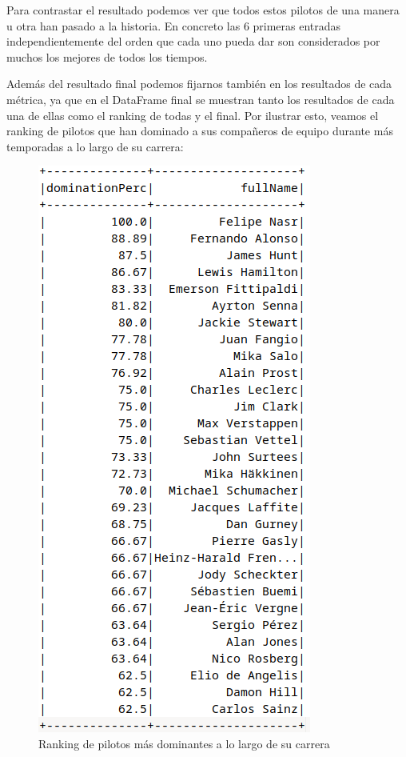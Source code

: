 \documentclass[12pt,twoside,titlepage]{report}
\begin{document}
Para contrastar el resultado podemos ver que todos estos pilotos de una manera u otra han pasado a la historia. En concreto las 6 primeras entradas independientemente del orden que cada uno pueda dar son considerados por muchos los mejores de todos los tiempos.

Además del resultado final podemos fijarnos también en los resultados de cada métrica, ya que en el DataFrame final se muestran tanto los resultados de cada una de ellas como el ranking de todas y el final. Por ilustrar esto, veamos el ranking de pilotos que han dominado a sus compañeros de equipo durante más temporadas a lo largo de su carrera:

\begin{figure}[H]
	\includegraphics[scale=0.3]{results/bestdrivers/driverdomperc.png}
	\centering
	\caption{Ranking de pilotos más dominantes a lo largo de su carrera}
	\label{fig:dominationPerc}
	\centering
\end{figure}
\end{document}
